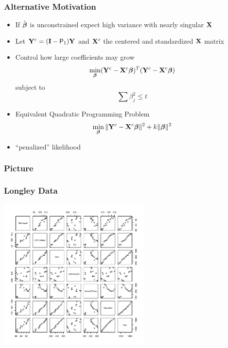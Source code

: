 \documentclass[handout]{beamer}
\begin{document}
\begin{frame}  \frametitle{Alternative Motivation}
  \begin{itemize}
  \item If  $\hat{\boldsymbol{\beta}}$ is unconstrained  expect high variance with nearly
    singular $\mathbf{X}$ \pause
  \item Let $\mathbf{Y}^c = (\mathbf{I} - \textsf{P}_1) \mathbf{Y}$  and $\mathbf{X}^c$ the centered and
    standardized  $\mathbf{X}$ matrix \pause
\item Control how large coefficients may grow \pause
    $$\min_{\boldsymbol{\beta}} (\mathbf{Y}^c - \mathbf{X}^c \boldsymbol{\beta})^T (\mathbf{Y}^c - \mathbf{X}^c\boldsymbol{\beta})$$
    subject to
    $$ \sum \beta_j^2 \le t$$ \pause
  \item Equivalent Quadratic Programming Problem
    $$\min_{\boldsymbol{\beta}} \| \mathbf{Y}^c - \mathbf{X}^c \boldsymbol{\beta}\|^2 + k \|\boldsymbol{\beta}\|^2$$ \pause
  \item ``penalized'' likelihood \pause
  \end{itemize}
\end{frame}
\begin{frame}\frametitle{Picture}
  
\end{frame}
\begin{frame}
  \frametitle{Longley Data}
  \centerline{\includegraphics[height=3in]{longley-pairs}}
\end{frame}
\end{document}
